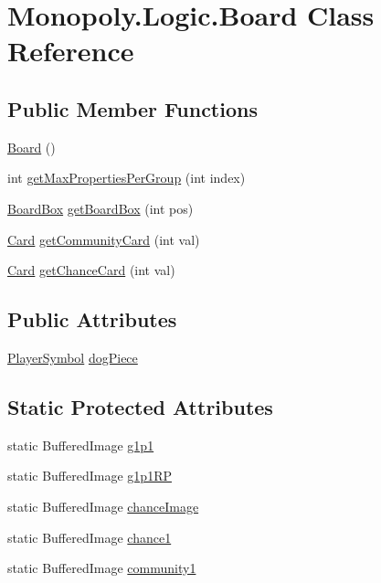 \hypertarget{class_monopoly_1_1_logic_1_1_board}{}\section{Monopoly.\+Logic.\+Board Class Reference}
\label{class_monopoly_1_1_logic_1_1_board}
\subsection*{Public Member Functions}
\begin{DoxyCompactItemize}
\item 
\hyperlink{class_monopoly_1_1_logic_1_1_board_a6167b16558607aa3fc71cf3f3fa146ae}{Board} ()
\item 
int \hyperlink{class_monopoly_1_1_logic_1_1_board_a8cb936eb34bc5fdd5bbe0a4105c0be29}{get\+Max\+Properties\+Per\+Group} (int index)
\item 
\hyperlink{class_monopoly_1_1_logic_1_1_board_box}{Board\+Box} \hyperlink{class_monopoly_1_1_logic_1_1_board_a836d88dbde44833965456754821edf96}{get\+Board\+Box} (int pos)
\item 
\hyperlink{class_monopoly_1_1_logic_1_1_card}{Card} \hyperlink{class_monopoly_1_1_logic_1_1_board_abc388b28666367962233ac118d4d744f}{get\+Community\+Card} (int val)
\item 
\hyperlink{class_monopoly_1_1_logic_1_1_card}{Card} \hyperlink{class_monopoly_1_1_logic_1_1_board_a077b7d4572891ce441be503451725e8d}{get\+Chance\+Card} (int val)
\end{DoxyCompactItemize}
\subsection*{Public Attributes}
\begin{DoxyCompactItemize}
\item 
\hyperlink{class_monopoly_1_1_logic_1_1_player_symbol}{Player\+Symbol} \hyperlink{class_monopoly_1_1_logic_1_1_board_a03890795935b1f54a94f2ca7dc4a6b0f}{dog\+Piece}
\end{DoxyCompactItemize}
\subsection*{Static Protected Attributes}
\begin{DoxyCompactItemize}
\item 
static Buffered\+Image \hyperlink{class_monopoly_1_1_logic_1_1_board_a79ef8aae1c6b842096b29f3db5080423}{g1p1}
\item 
static Buffered\+Image \hyperlink{class_monopoly_1_1_logic_1_1_board_aaeeda9f5c80e5ed76e67289cb3f22ea7}{g1p1\+RP}
\item 
static Buffered\+Image \hyperlink{class_monopoly_1_1_logic_1_1_board_adf2202931ca275781b6fa08cb75e4f74}{chance\+Image}
\item 
static Buffered\+Image \hyperlink{class_monopoly_1_1_logic_1_1_board_a06ab408e2e521277d7ef90c5b1129939}{chance1}
\item 
static Buffered\+Image \hyperlink{class_monopoly_1_1_logic_1_1_board_a5cb4d4c2e50425ce6e342d8c35e4ed0f}{community1}
\end{DoxyCompactItemize}
